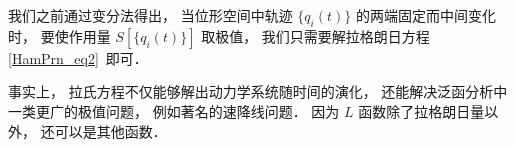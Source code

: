 

我们之前通过变分法得出， 当位形空间中轨迹 $\{q_i(t)\}$ 的两端固定而中间变化时， 要使作用量 $S[\{q_i(t)\}]$ 取极值， 我们只需要解拉格朗日方程\autoref{HamPrn_eq2}~即可．

事实上， 拉氏方程不仅能够解出动力学系统随时间的演化， 还能解决泛函分析中一类更广的极值问题， 例如著名的速降线问题． 因为 $L$ 函数除了拉格朗日量以外， 还可以是其他函数．
